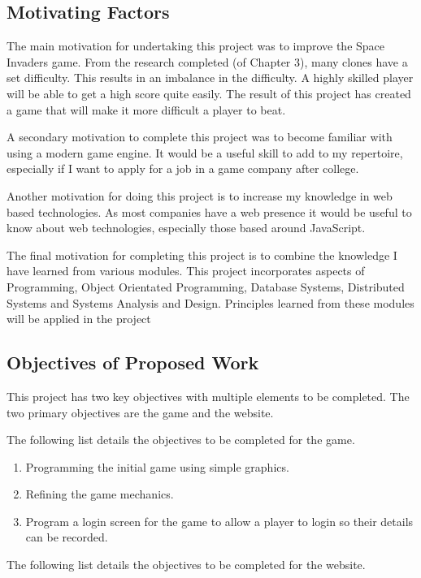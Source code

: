 \documentclass[12pt]{article}
\begin{document}
\subsection{Motivating Factors}
The main motivation for undertaking this project was to improve the Space Invaders game. From the research completed (of Chapter 3), many clones have a set difficulty. This results in an imbalance in the difficulty. A highly skilled player will be able to get a high score quite easily. The result of this project has created a game that will make it more difficult a player to beat. 

A secondary motivation to complete this project was to become familiar with using a modern game engine. It would be a useful skill to add to my repertoire, especially if I want to apply for a job in a game company after college. 

Another motivation for doing this project is to increase my knowledge in web based technologies. As most companies have a web presence it would be useful to know about web technologies, especially those based around JavaScript. 

The final motivation for completing this project is to combine the knowledge I have learned from various modules. This project incorporates aspects of Programming, Object Orientated Programming, Database Systems, Distributed Systems and Systems Analysis and Design. Principles learned from these modules will be applied in the project

\subsection{Objectives of Proposed Work}
This project has two key objectives with multiple elements to be completed. The two primary objectives are the game and the website. 

The following list details the objectives to be completed for the game.

\begin{enumerate}
\item Programming the initial game using simple graphics.
\item Refining the game mechanics.
\item Program a login screen for the game to allow a player to login so their details can
be recorded.
\end{enumerate}

The following list details the objectives to be completed for the website.
\end{document}
